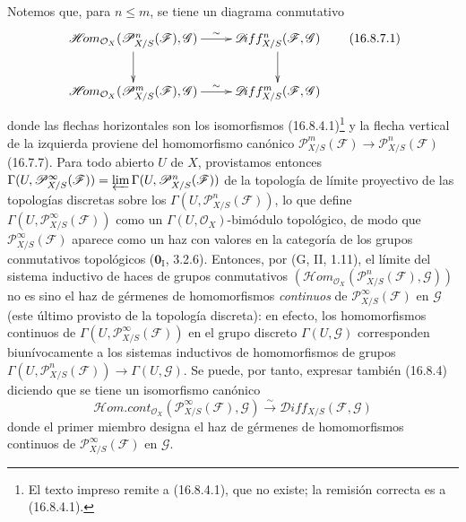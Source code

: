 \begin{env}[16.8.7]
Notemos que, para $n\leq m$, se tiene un diagrama conmutativo
\[
  \xymatrix{
    \mathscr{H}\!om_{\mathcal{O}_X}
      (\mathscr{P}_{X/S}^n(\mathscr{F}),\mathscr{G})
      \ar[r]^-{\sim}\ar[d]
      &\mathscr{D}\!iff_{X/S}^n(\mathscr{F},\mathscr{G})\ar[d]\\
    \mathscr{H}\!om_{\mathcal{O}_X}
      (\mathscr{P}_{X/S}^m(\mathscr{F}),\mathscr{G})
      \ar[r]^-{\sim}
      &\mathscr{D}\!iff_{X/S}^m(\mathscr{F},\mathscr{G})
  }
  \tag{16.8.7.1}
  \label{IV.16.8.7.1}
\]
donde las flechas horizontales son los isomorfismos
(16.8.4.1)\footnote{El texto impreso remite a (16.8.4.1), que no existe; la
remisión correcta es a (16.8.4.1).} y la flecha vertical de la izquierda
proviene del homomorfismo canónico
$\mathscr{P}_{X/S}^m(\mathscr{F})\to
\mathscr{P}_{X/S}^n(\mathscr{F})$ (16.7.7). Para todo abierto $U$ de $X$,
provistamos entonces
$\Gamma(U,\mathscr{P}_{X/S}^{\infty}(\mathscr{F}))=\varprojlim\Gamma(U,\mathscr{P}_{X/S}^n(\mathscr{F}))$
de la topología de límite proyectivo de las topologías discretas sobre los
$\Gamma(U,\mathscr{P}_{X/S}^n(\mathscr{F}))$, lo que define
$\Gamma(U,\mathscr{P}_{X/S}^{\infty}(\mathscr{F}))$ como un
$\Gamma(U,\mathcal{O}_X)$-bimódulo topológico, de modo que
$\mathscr{P}_{X/S}^{\infty}(\mathscr{F})$ aparece como un haz con valores en
la categoría de los grupos conmutativos topológicos
($\mathbf{0}_{\mathrm I}$, 3.2.6). Entonces, por (G, II, 1.11), el límite del sistema
inductivo de haces de grupos conmutativos
$(\mathscr{H}\!om_{\mathcal{O}_X}(\mathscr{P}_{X/S}^n(\mathscr{F}),\mathscr{G}))$
no es sino el haz de gérmenes de homomorfismos \emph{continuos} de
$\mathscr{P}_{X/S}^{\infty}(\mathscr{F})$ en $\mathscr{G}$ (este último
provisto de la topología discreta): en efecto, los homomorfismos continuos de
$\Gamma(U,\mathscr{P}_{X/S}^{\infty}(\mathscr{F}))$ en el grupo discreto
$\Gamma(U,\mathscr{G})$ corresponden biunívocamente a los sistemas inductivos
de homomorfismos de grupos
$\Gamma(U,\mathscr{P}_{X/S}^n(\mathscr{F}))\to\Gamma(U,\mathscr{G})$. Se
puede, por tanto, expresar también (16.8.4) diciendo que se tiene un
isomorfismo canónico
\[
  \mathscr{H}\!om.\mathit{cont}_{\mathcal{O}_X}
  (\mathscr{P}_{X/S}^{\infty}(\mathscr{F}),\mathscr{G})
  \xrightarrow{\sim}
  \mathscr{D}\!iff_{X/S}(\mathscr{F},\mathscr{G})
\]
donde el primer miembro designa el haz de gérmenes de homomorfismos continuos
de $\mathscr{P}_{X/S}^{\infty}(\mathscr{F})$ en $\mathscr{G}$.
\end{env}

